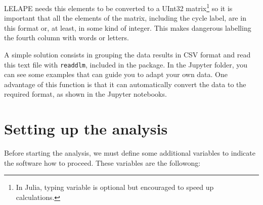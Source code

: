 LELAPE needs this elements to be converted to a UInt32 matrix\footnote{In Julia, typing variable is optional but encouraged to speed up calculations.} so it is important that all the elements of the matrix, including the cycle label, are in this format or, at least, in some kind of integer. This makes dangerous labelling the fourth column with words or letters. 

A simple solution consists in grouping the data results in CSV format and read this text file with \texttt{readdlm}, included in the  package. In the Jupyter folder, you can see some examples that can guide you to adapt your own data. One advantage of this function is that it can automatically convert the data to the required format, as shown in the Jupyter notebooks.

\section{Setting up the analysis}
%
Before starting the analysis, we must define some additional variables to indicate the software how to proceed. These variables are the followong:
%
